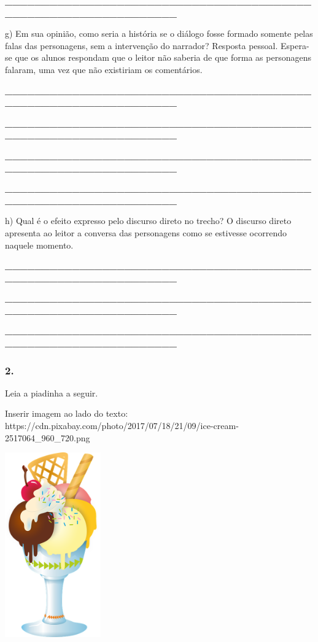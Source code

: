 \textbf{\_\_\_\_\_\_\_\_\_\_\_\_\_\_\_\_\_\_\_\_\_\_\_\_\_\_\_\_\_\_\_\_\_\_\_\_\_\_\_\_\_\_\_\_\_\_\_\_\_\_\_\_\_\_\_\_\_\_\_\_\_\_\_\_}

g) Em sua opinião, como seria a história se o diálogo fosse formado
somente pelas falas das personagens, sem a intervenção do narrador?
Resposta pessoal. Espera-se que os alunos respondam que o leitor não
saberia de que forma as personagens falaram, uma vez que não existiriam
os comentários.

\textbf{\_\_\_\_\_\_\_\_\_\_\_\_\_\_\_\_\_\_\_\_\_\_\_\_\_\_\_\_\_\_\_\_\_\_\_\_\_\_\_\_\_\_\_\_\_\_\_\_\_\_\_\_\_\_\_\_\_\_\_\_\_\_\_\_}

\textbf{\_\_\_\_\_\_\_\_\_\_\_\_\_\_\_\_\_\_\_\_\_\_\_\_\_\_\_\_\_\_\_\_\_\_\_\_\_\_\_\_\_\_\_\_\_\_\_\_\_\_\_\_\_\_\_\_\_\_\_\_\_\_\_\_}

\textbf{\_\_\_\_\_\_\_\_\_\_\_\_\_\_\_\_\_\_\_\_\_\_\_\_\_\_\_\_\_\_\_\_\_\_\_\_\_\_\_\_\_\_\_\_\_\_\_\_\_\_\_\_\_\_\_\_\_\_\_\_\_\_\_\_}

\textbf{\_\_\_\_\_\_\_\_\_\_\_\_\_\_\_\_\_\_\_\_\_\_\_\_\_\_\_\_\_\_\_\_\_\_\_\_\_\_\_\_\_\_\_\_\_\_\_\_\_\_\_\_\_\_\_\_\_\_\_\_\_\_\_\_}

h) Qual é o efeito expresso pelo discurso direto no trecho? O discurso
direto apresenta ao leitor a conversa das personagens como se estivesse
ocorrendo naquele momento.

\textbf{\_\_\_\_\_\_\_\_\_\_\_\_\_\_\_\_\_\_\_\_\_\_\_\_\_\_\_\_\_\_\_\_\_\_\_\_\_\_\_\_\_\_\_\_\_\_\_\_\_\_\_\_\_\_\_\_\_\_\_\_\_\_\_\_}

\protect\hypertarget{_Hlk127808036}{}{}\textbf{\_\_\_\_\_\_\_\_\_\_\_\_\_\_\_\_\_\_\_\_\_\_\_\_\_\_\_\_\_\_\_\_\_\_\_\_\_\_\_\_\_\_\_\_\_\_\_\_\_\_\_\_\_\_\_\_\_\_\_\_\_\_\_\_}

\textbf{\_\_\_\_\_\_\_\_\_\_\_\_\_\_\_\_\_\_\_\_\_\_\_\_\_\_\_\_\_\_\_\_\_\_\_\_\_\_\_\_\_\_\_\_\_\_\_\_\_\_\_\_\_\_\_\_\_\_\_\_\_\_\_\_}

\subsubsection{2. }\label{section-56}

Leia a piadinha a seguir.

Inserir imagem ao lado do texto:
https://cdn.pixabay.com/photo/2017/07/18/21/09/ice-cream-2517064\_960\_720.png

\includegraphics[width=1.61997in,height=3.13542in]{media/image20.png}

